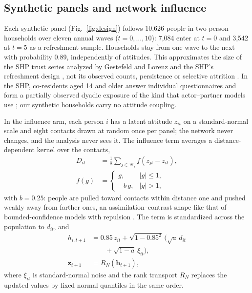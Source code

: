 \subsection{Synthetic panels and network influence}\label{sec:methods-panels}

Each synthetic panel (Fig.~\ref{fig:design}) follows 10,626 people in two-person households over eleven annual waves ($t=0,\ldots,10$): 7,084 enter at $t=0$ and 3,542 at $t=5$ as a refreshment sample. Households stay from one wave to the next with probability 0.89, independently of attitudes. This approximates the size of the SHP trust series analyzed by Gestefeld and Lorenz \cite{gestefeld2023} and the SHP's refreshment design \cite{voorpostel2025shp}, not its observed counts, persistence or selective attrition \cite{lipps2007,voorpostel2010}. In the SHP, co-residents aged 14 and older answer individual questionnaires \cite{voorpostel2025shp} and form a partially observed dyadic exposure of the kind that actor--partner models use \cite{kennykashy2006,kim2024}; our synthetic households carry no attitude coupling.

In the influence arm, each person $i$ has a latent attitude $z_{it}$ on a standard-normal scale and eight contacts drawn at random once per panel; the network never changes, and the analysis never sees it. The influence term averages a distance-dependent kernel over the contacts,
\begin{equation}
\begin{aligned}
D_{it}&=\frac18\sum_{j\in\mathcal N_i}f(z_{jt}-z_{it}),\\
f(g)&=\begin{cases}g,&|g|\le1,\\-b\,g,&|g|>1,\end{cases}
\end{aligned}
\end{equation}
with $b=0.25$: people are pulled toward contacts within distance one and pushed weakly away from farther ones, an assimilation--contrast shape like that of bounded-confidence models with repulsion \cite{flache2017,jager2005}. The term is standardized across the population to $d_{it}$, and
\begin{equation}
\begin{aligned}
h_{i,t+1}&=0.85\,z_{it}+\sqrt{1-0.85^2}\,\bigl(\sqrt a\,d_{it}\\
&\qquad+\sqrt{1-a}\,\xi_{it}\bigr),\\
\mathbf z_{t+1}&=R_N(\mathbf h_{t+1}),
\end{aligned}
\end{equation}
where $\xi_{it}$ is standard-normal noise and the rank transport $R_N$ replaces the updated values by fixed normal quantiles in the same order.

